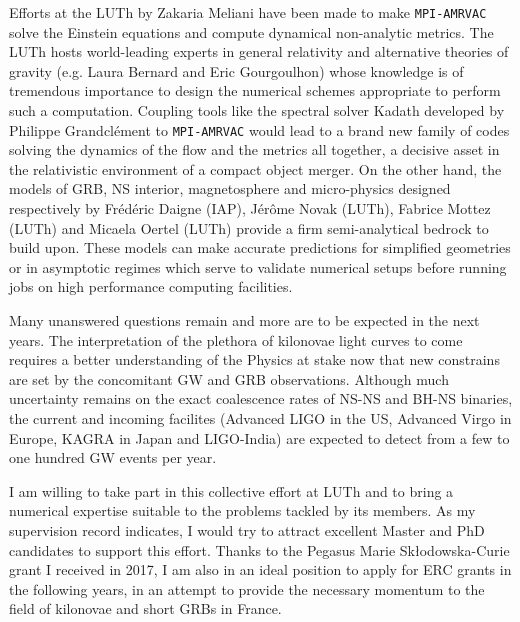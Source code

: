 \documentclass[12pt,onecolumn]{article}
\makeatletter
\newcommand{\gw}{GW\xspace}
\newcommand{\grb}{GRB\xspace}
\newcommand{\grbs}{GRBs\xspace}
\newcommand*{\ns}{NS\@\xspace}
\newcommand*{\bh}{BH\@\xspace}
\newcommand*{\eg}{e.g.\@\xspace}
\makeatother
\begin{document}
Efforts at the LUTh by Zakaria Meliani have been made to make \texttt{MPI-AMRVAC} solve the Einstein equations and compute dynamical non-analytic metrics. The LUTh hosts world-leading experts in general relativity and alternative theories of gravity (\eg Laura Bernard and Eric Gourgoulhon) whose knowledge is of tremendous importance to design the numerical schemes appropriate to perform such a computation. Coupling tools like the spectral solver Kadath developed by Philippe Grandcl\'{e}ment to \texttt{MPI-AMRVAC} would lead to a brand new family of codes solving the dynamics of the flow and the metrics all together, a decisive asset in the relativistic environment of a compact object merger. On the other hand, the models of \grb, \ns interior, magnetosphere and micro-physics designed respectively by Fr\'{e}d\'{e}ric Daigne (IAP), J\'{e}r\^{o}me Novak (LUTh), Fabrice Mottez (LUTh) and Micaela Oertel (LUTh) provide a firm semi-analytical bedrock to build upon. These models can make accurate predictions for simplified geometries or in asymptotic regimes which serve to validate numerical setups before running jobs on high performance computing facilities.

\newpage

Many unanswered questions remain and more are to be expected in the next years. The interpretation of the plethora of kilonovae light curves to come requires a better understanding of the Physics at stake now that new constrains are set by the concomitant \gw and \grb observations. Although much uncertainty remains on the exact coalescence rates of \ns-\ns and \bh-\ns binaries, the current and incoming facilites (Advanced LIGO in the US, Advanced Virgo in Europe, KAGRA in Japan and LIGO-India) are expected to detect from a few to one hundred \gw events per year. 

I am willing to take part in this collective effort at LUTh and to bring a numerical expertise suitable to the problems tackled by its members. As my supervision record indicates, I would try to attract excellent Master and PhD candidates to support this effort. Thanks to the Pegasus Marie Sk\l{}odowska-Curie grant I received in 2017, I am also in an ideal position to apply for ERC grants in the following years, in an attempt to provide the necessary momentum to the field of kilonovae and short \grbs in France.




\vspace*{0.6cm}
\setlength\bibitemsep{0pt}
%
%

%
\printbibliography[heading=none,title={},omitnumbers=true]
\end{document}
